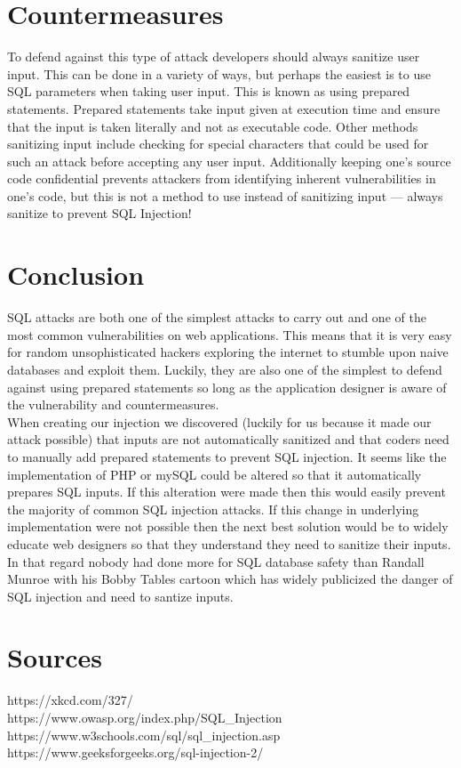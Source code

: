 \documentclass[11pt]{article}
\begin{document}
\section*{Countermeasures}
To defend against this type of attack developers should always sanitize user input. This can be done in a variety of ways, but perhaps the easiest is to use SQL parameters when taking user input. This is known as using prepared statements. Prepared statements take input given at execution time and ensure that the input is taken literally and not as executable code. Other methods sanitizing input include checking for special characters that could be used for such an attack before accepting any user input. Additionally keeping one’s source code confidential prevents attackers from identifying inherent vulnerabilities in one’s code, but this is not a method to use instead of sanitizing input — always sanitize to prevent SQL Injection!

\section*{Conclusion}
SQL attacks are both one of the simplest attacks to carry out and one of the most common vulnerabilities on web applications. This means that it is very easy for random unsophisticated hackers exploring the internet to stumble upon naive databases and exploit them. Luckily, they are also one of the simplest to defend against using prepared statements so long as the application designer is aware of the vulnerability and countermeasures. \\

When creating our injection we discovered (luckily for us because it made our attack possible) that inputs are not automatically sanitized and that coders need to manually add prepared statements to prevent SQL injection. It seems like the implementation of PHP or mySQL could be altered so that it automatically prepares SQL inputs. If this alteration were made then this would easily prevent the majority of common SQL injection attacks. If this change in underlying implementation were not possible then the next best solution would be to widely educate web designers so that they understand they need to sanitize their inputs. In that regard nobody had done more for SQL database safety than Randall Munroe with his Bobby Tables cartoon which has widely publicized the danger of SQL injection and need to santize inputs. 

\section*{Sources}
https://xkcd.com/327/ \\
https://www.owasp.org/index.php/SQL\_Injection \\
https://www.w3schools.com/sql/sql\_injection.asp \\
https://www.geeksforgeeks.org/sql-injection-2/
\end{document}
